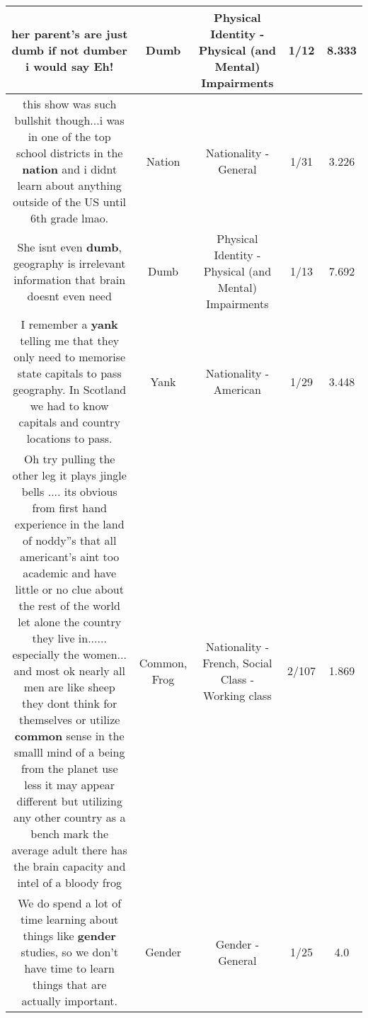\documentclass[11pt]{article}
\newlength\mylength
\begin{document}
\begin{center}
\begin{longtable}{|C{.65\mylength}|C{.30\mylength}|C{.12\mylength}|C{.12\mylength}|C{.12\mylength}|}
  \small her parent's are just \textbf{dumb} if not dumber i would say Eh!\normalsize   & Dumb & Physical Identity - Physical (and Mental) Impairments & 1/12 & 8.333 \\  \hline
  \small this show was such bullshit though...i was in one of the top school districts in the \textbf{nation} and i didnt learn about anything outside of the US until 6th grade lmao.\normalsize   & Nation & Nationality - General & 1/31 & 3.226 \\  \hline
  \small She isnt even \textbf{dumb}, geography is irrelevant information that brain doesnt even need\normalsize   & Dumb & Physical Identity - Physical (and Mental) Impairments & 1/13 & 7.692 \\  \hline
  \small I remember a \textbf{yank} telling me that they only need to memorise state capitals to pass geography.  In Scotland we had to know capitals and country locations to pass.\normalsize   & Yank & Nationality - American & 1/29 & 3.448 \\  \hline
  \small Oh try pulling the other leg it plays jingle bells .... its obvious from first hand experience in the land of noddy''s that all americant's aint too academic and have little or no clue about the rest of the world let alone the country they live in...... especially the women... and most ok nearly all men are like sheep they dont think for themselves or utilize \textbf{common} sense in the smalll mind of a being from the planet use less it may appear different but utilizing any other country as a bench mark the average adult there has the brain capacity and intel of a bloody frog\normalsize   & Common, Frog & Nationality - French, Social Class - Working class & 2/107 & 1.869 \\  \hline
  \small We do spend a lot of time learning about things like \textbf{gender} studies, so we don't have time to learn things that are actually important.\normalsize   & Gender & Gender - General & 1/25 & 4.0 \\  \hline

\end{longtable}
\end{center}
\end{document}
